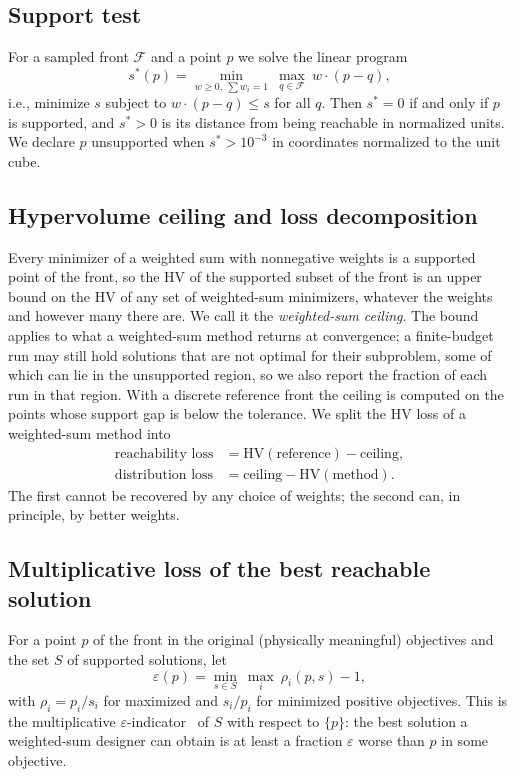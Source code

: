 \documentclass[journal]{IEEEtran}
\theoremstyle{remark}
\begin{document}
\subsection{Support test}
For a sampled front $\mathcal{F}$ and a point $p$ we solve the linear program
\begin{equation}
s^*(p) = \min_{w \ge 0,\ \sum w_i = 1}\ \max_{q \in \mathcal{F}}\ w\cdot(p - q),
\label{eq:gap}
\end{equation}
i.e., minimize $s$ subject to $w\cdot(p-q) \le s$ for all $q$. Then $s^* = 0$ if and only if $p$ is
supported, and $s^* > 0$ is its distance from being reachable in normalized units. We declare $p$
unsupported when $s^* > 10^{-3}$ in coordinates normalized to the unit cube.

\subsection{Hypervolume ceiling and loss decomposition}
Every minimizer of a weighted sum with nonnegative weights is a supported point of the front, so the
HV of the supported subset of the front is an upper bound on the HV of any set of weighted-sum
minimizers, whatever the weights and however many there are. We call it the
\emph{weighted-sum ceiling}. The bound applies to what a weighted-sum method returns at convergence; a
finite-budget run may still hold solutions that are not optimal for their subproblem, some of which can
lie in the unsupported region, so we also report the fraction of each run in that region. With a
discrete reference front the ceiling is computed on the points whose support gap is below the
tolerance. We split the HV loss of a weighted-sum method into
\begin{align}
\text{reachability loss} &= \mathrm{HV}(\text{reference}) - \text{ceiling},\\
\text{distribution loss} &= \text{ceiling} - \mathrm{HV}(\text{method}).
\end{align}
The first cannot be recovered by any choice of weights; the second can, in principle, by better
weights.

\subsection{Multiplicative loss of the best reachable solution}
For a point $p$ of the front in the original (physically meaningful) objectives and the set $S$ of
supported solutions, let
\begin{equation}
\varepsilon(p) = \min_{s\in S}\ \max_i\ \rho_i(p,s) - 1,
\end{equation}
with $\rho_i = p_i/s_i$ for maximized and $s_i/p_i$ for minimized positive objectives. This is the
multiplicative $\varepsilon$-indicator~\cite{Zitzler2003} of $S$ with respect to $\{p\}$: the best
solution a weighted-sum designer can obtain is at least a fraction $\varepsilon$ worse than $p$ in some
objective.
\end{document}
